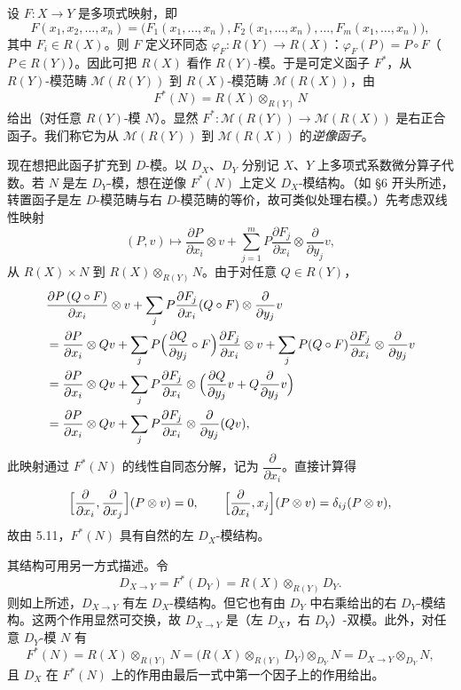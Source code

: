 设 $F:X\longrightarrow Y$ 是多项式映射，即
$$F(x_1,x_2,\dots,x_n)=\bigl(F_1(x_1,\dots,x_n),F_2(x_1,\dots,x_n),\dots,F_m(x_1,\dots,x_n)\bigr),$$
其中 $F_i\in R(X)$。则 $F$ 定义环同态 $\varphi_F:R(Y)\to R(X)$：$\varphi_F(P)=P\circ F$（$P\in R(Y)$）。因此可把 $R(X)$ 看作 $R(Y)$-模。于是可定义函子 $F^*$，从 $R(Y)$-模范畴 $\mathcal{M}(R(Y))$ 到 $R(X)$-模范畴 $\mathcal{M}(R(X))$，由
$$F^*(N)=R(X)\otimes_{R(Y)}N$$
给出（对任意 $R(Y)$-模 $N$）。显然 $F^*:\mathcal{M}(R(Y))\to\mathcal{M}(R(X))$ 是右正合函子。我们称它为从 $\mathcal{M}(R(Y))$ 到 $\mathcal{M}(R(X))$ 的\emph{逆像函子}。

现在想把此函子扩充到 $D$-模。以 $D_X$、$D_Y$ 分别记 $X$、$Y$ 上多项式系数微分算子代数。若 $N$ 是左 $D_Y$-模，想在逆像 $F^*(N)$ 上定义 $D_X$-模结构。（如 §6 开头所述，转置函子是左 $D$-模范畴与右 $D$-模范畴的等价，故可类似处理右模。）先考虑双线性映射
$$(P,v)\longmapsto\frac{\partial P}{\partial x_i}\otimes v+\sum_{j=1}^m P\frac{\partial F_j}{\partial x_i}\otimes\frac{\partial}{\partial y_j}v,$$
从 $R(X)\times N$ 到 $R(X)\otimes_{R(Y)}N$。由于对任意 $Q\in R(Y)$，
\begin{align*}
&\frac{\partial P\,(Q\circ F)}{\partial x_i}\otimes v+\sum_j P\frac{\partial F_j}{\partial x_i}(Q\circ F)\otimes\frac{\partial}{\partial y_j}v\\
&=\frac{\partial P}{\partial x_i}\otimes Qv+\sum_j P\Bigl(\frac{\partial Q}{\partial y_j}\circ F\Bigr)\frac{\partial F_j}{\partial x_i}\otimes v+\sum_j P(Q\circ F)\frac{\partial F_j}{\partial x_i}\otimes\frac{\partial}{\partial y_j}v\\
&=\frac{\partial P}{\partial x_i}\otimes Qv+\sum_j P\frac{\partial F_j}{\partial x_i}\otimes\Bigl(\frac{\partial Q}{\partial y_j}v+Q\frac{\partial}{\partial y_j}v\Bigr)\\
&=\frac{\partial P}{\partial x_i}\otimes Qv+\sum_j P\frac{\partial F_j}{\partial x_i}\otimes\frac{\partial}{\partial y_j}(Qv),
\end{align*}
此映射通过 $F^*(N)$ 的线性自同态分解，记为 $\dfrac{\partial}{\partial x_i}$。直接计算得
$$\Bigl[\frac{\partial}{\partial x_i},\frac{\partial}{\partial x_j}\Bigr](P\otimes v)=0,\qquad \Bigl[\frac{\partial}{\partial x_i},x_j\Bigr](P\otimes v)=\delta_{ij}(P\otimes v),$$
故由 5.11，$F^*(N)$ 具有自然的左 $D_X$-模结构。

其结构可用另一方式描述。令
$$D_{X\to Y}=F^*(D_Y)=R(X)\otimes_{R(Y)}D_Y.$$
则如上所述，$D_{X\to Y}$ 有左 $D_X$-模结构。但它也有由 $D_Y$ 中右乘给出的右 $D_Y$-模结构。这两个作用显然可交换，故 $D_{X\to Y}$ 是（左 $D_X$，右 $D_Y$）-双模。此外，对任意 $D_Y$-模 $N$ 有
$$F^*(N)=R(X)\otimes_{R(Y)}N=\bigl(R(X)\otimes_{R(Y)}D_Y\bigr)\otimes_{D_Y}N=D_{X\to Y}\otimes_{D_Y}N,$$
且 $D_X$ 在 $F^*(N)$ 上的作用由最后一式中第一个因子上的作用给出。

